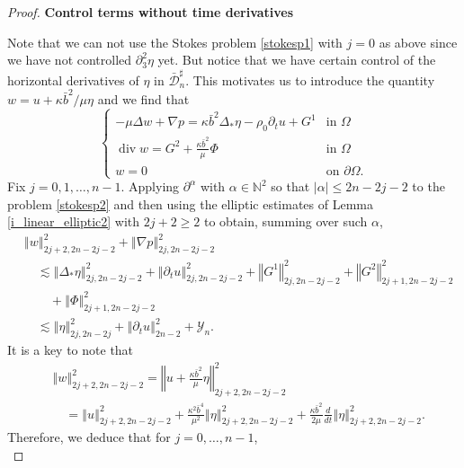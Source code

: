 \documentclass[a4paper,reqno,11pt]{amsart}
\numberwithin{equation}{section}
\providecommand{\norm}[1]{\left\Vert#1\right\Vert}
\providecommand{\norm}[1]{\left\Vert#1\right\Vert}
\begin{document}
\begin{proof}
{\bf Control terms without time derivatives}

Note that we can not use the Stokes problem \eqref{stokesp1} with $j=0$ as above since we have not controlled ${\partial}_3^2\eta$ yet. But notice that we have certain control of the horizontal derivatives of $\eta$ in $\bar{\mathcal{D}}_n^\sharp$. This motivates us to introduce the quantity $w=  u+  \kappa\bar b^2/\mu \eta$ and we find that
\begin{equation}\label{stokesp2}
\begin{cases}
-\mu\Delta w+\nabla p=\kappa\bar b^2 \Delta_\ast\eta-\rho_0\partial_t u+G^1& \text{in }
\Omega
\\ \operatorname{div} w=  G^2+ \frac{ \kappa\bar b^2}{\mu}  \Phi& \text{in }
\Omega
\\  w=0 &\text{on }{\partial}\Omega.
\end{cases}
\end{equation}
Fix $j=0,1,\dots,n-1$. Applying ${\partial}^{\alpha}$ with ${\alpha}\in \mathbb{N}^2$ so that $|{\alpha}|\le 2n-2j-2$ to the problem \eqref{stokesp2} and then using the elliptic estimates of Lemma \ref{i_linear_elliptic2} with $2j+2\ge 2$ to obtain, summing over such ${\alpha}$,
\begin{equation}\label{hihoh}
\begin{split}
&\norm{w}_{2j+2,2n-2j-2}^2+\norm{\nabla p}_{2j,2n-2j-2}^2
\\&\quad{\lesssim} \norm{\Delta_\ast\eta}_{2j,2n-2j-2}^2+\norm{{\partial}_t u}_{2j,2n-2j-2}^2+\norm{G^1}_{2j,2n-2j-2}^2+\norm{G^2}_{2j+1,2n-2j-2}^2
\\&\qquad+\norm{\Phi}_{2j+1,2n-2j-2}^2
\\&\quad{\lesssim} \norm{ \eta}_{2j,2n-2j}^2+\norm{{\partial}_t u}_{2n-2}^2  +{\mathcal{Y}}_n.
\end{split}
\end{equation}
It is a key to note that
\begin{equation}
\begin{split}
&\norm{w}_{2j+2,2n-2j-2}^2 = \norm{     u+     \frac{ \kappa\bar b^2}{\mu} \eta  }_{2j+2,2n-2j-2}^2
\\&\quad= \norm{      u  }_{2j+2,2n-2j-2}^2+ \frac{ \kappa^2\bar b^4}{\mu^2}\norm{       \eta  }_{2j+2,2n-2j-2}^2+ \frac{ \kappa\bar b^2}{2\mu} \frac{d}{dt}\norm{     \eta  }_{2j+2,2n-2j-2}^2.
\end{split}
\end{equation}
Therefore, we deduce that for $j=0,\dots, n-1$,
\begin{equation}

\end{equation}
\end{proof}
\end{document}
